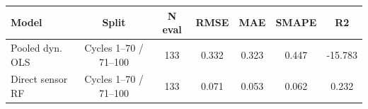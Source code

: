 \begin{tabular}{lcccccc}
\toprule
Model & Split & N eval & RMSE & MAE & SMAPE & R2 \\
\midrule
Pooled dyn. OLS & Cycles 1--70 / 71--100 & 133 & 0.332 & 0.323 & 0.447 & -15.783 \\
Direct sensor RF & Cycles 1--70 / 71--100 & 133 & 0.071 & 0.053 & 0.062 & 0.232 \\
\bottomrule
\end{tabular}